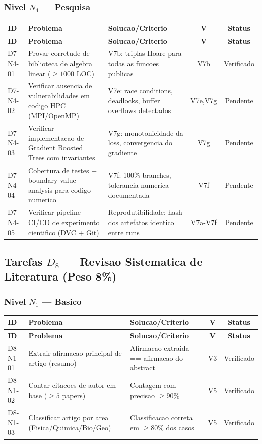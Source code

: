 \subsubsection{Nivel $N_4$ --- Pesquisa}

\begin{longtable}{|p{2.0cm}|p{4.2cm}|p{4.2cm}|c|c|}
\hline
\textbf{ID} & \textbf{Problema} & \textbf{Solucao/Criterio} & \textbf{V} & \textbf{Status} \\
\hline
\endfirsthead
\hline
\textbf{ID} & \textbf{Problema} & \textbf{Solucao/Criterio} & \textbf{V} & \textbf{Status} \\
\hline
\endhead
\hline
\endfoot
D7-N4-01 & Provar corretude de biblioteca de algebra linear ($\geq 1000$ LOC) & V7b: triplas Hoare para todas as funcoes publicas & V7b & Verificado \\
\hline
D7-N4-02 & Verificar ausencia de vulnerabilidades em codigo HPC (MPI/OpenMP) & V7e: race conditions, deadlocks, buffer overflows detectados & V7e,V7g & Pendente \\
\hline
D7-N4-03 & Verificar implementacao de Gradient Boosted Trees com invariantes & V7g: monotonicidade da loss, convergencia do gradiente & V7g & Pendente \\
\hline
D7-N4-04 & Cobertura de testes + boundary value analysis para codigo numerico & V7f: 100\% branches, tolerancia numerica documentada & V7f & Pendente \\
\hline
D7-N4-05 & Verificar pipeline CI/CD de experimento cientifico (DVC + Git) & Reprodutibilidade: hash dos artefatos identico entre runs & V7a-V7f & Pendente \\
\hline
\end{longtable}

\subsection{Tarefas $D_8$ --- Revisao Sistematica de Literatura (Peso 8\%)}

\subsubsection{Nivel $N_1$ --- Basico}

\begin{longtable}{|p{2.0cm}|p{4.2cm}|p{4.2cm}|c|c|}
\hline
\textbf{ID} & \textbf{Problema} & \textbf{Solucao/Criterio} & \textbf{V} & \textbf{Status} \\
\hline
\endfirsthead
\hline
\textbf{ID} & \textbf{Problema} & \textbf{Solucao/Criterio} & \textbf{V} & \textbf{Status} \\
\hline
\endhead
\hline
\endfoot
D8-N1-01 & Extrair afirmacao principal de artigo (resumo) & Afirmacao extraida == afirmacao do abstract & V3 & Verificado \\
\hline
D8-N1-02 & Contar citacoes de autor em base ($\geq 5$ papers) & Contagem com precisao $\geq 90\%$ & V5 & Verificado \\
\hline
D8-N1-03 & Classificar artigo por area (Fisica/Quimica/Bio/Geo) & Classificacao correta em $\geq 80\%$ dos casos & V5 & Verificado \\
\hline
\end{longtable}

